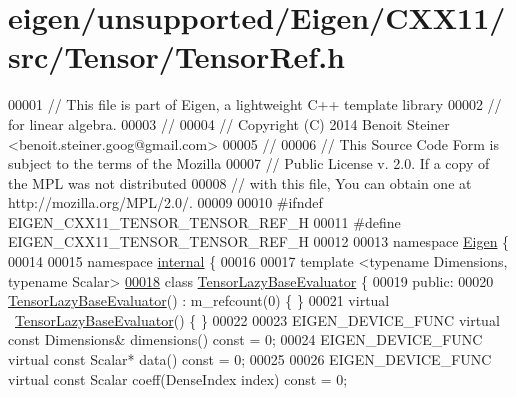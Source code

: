 \hypertarget{eigen_2unsupported_2_eigen_2_c_x_x11_2src_2_tensor_2_tensor_ref_8h_source}{}\section{eigen/unsupported/\+Eigen/\+C\+X\+X11/src/\+Tensor/\+Tensor\+Ref.h}
\label{eigen_2unsupported_2_eigen_2_c_x_x11_2src_2_tensor_2_tensor_ref_8h_source}

\begin{DoxyCode}
00001 \textcolor{comment}{// This file is part of Eigen, a lightweight C++ template library}
00002 \textcolor{comment}{// for linear algebra.}
00003 \textcolor{comment}{//}
00004 \textcolor{comment}{// Copyright (C) 2014 Benoit Steiner <benoit.steiner.goog@gmail.com>}
00005 \textcolor{comment}{//}
00006 \textcolor{comment}{// This Source Code Form is subject to the terms of the Mozilla}
00007 \textcolor{comment}{// Public License v. 2.0. If a copy of the MPL was not distributed}
00008 \textcolor{comment}{// with this file, You can obtain one at http://mozilla.org/MPL/2.0/.}
00009 
00010 \textcolor{preprocessor}{#ifndef EIGEN\_CXX11\_TENSOR\_TENSOR\_REF\_H}
00011 \textcolor{preprocessor}{#define EIGEN\_CXX11\_TENSOR\_TENSOR\_REF\_H}
00012 
00013 \textcolor{keyword}{namespace }\hyperlink{namespace_eigen}{Eigen} \{
00014 
00015 \textcolor{keyword}{namespace }\hyperlink{namespaceinternal}{internal} \{
00016 
00017 \textcolor{keyword}{template} <\textcolor{keyword}{typename} Dimensions, \textcolor{keyword}{typename} Scalar>
\hyperlink{class_eigen_1_1internal_1_1_tensor_lazy_base_evaluator}{00018} \textcolor{keyword}{class }\hyperlink{class_eigen_1_1internal_1_1_tensor_lazy_base_evaluator}{TensorLazyBaseEvaluator} \{
00019  \textcolor{keyword}{public}:
00020   \hyperlink{class_eigen_1_1internal_1_1_tensor_lazy_base_evaluator}{TensorLazyBaseEvaluator}() : m\_refcount(0) \{ \}
00021   \textcolor{keyword}{virtual} ~\hyperlink{class_eigen_1_1internal_1_1_tensor_lazy_base_evaluator}{TensorLazyBaseEvaluator}() \{ \}
00022 
00023   EIGEN\_DEVICE\_FUNC \textcolor{keyword}{virtual} \textcolor{keyword}{const} Dimensions& dimensions() \textcolor{keyword}{const} = 0;
00024   EIGEN\_DEVICE\_FUNC \textcolor{keyword}{virtual} \textcolor{keyword}{const} Scalar* data() \textcolor{keyword}{const} = 0;
00025 
00026   EIGEN\_DEVICE\_FUNC \textcolor{keyword}{virtual} \textcolor{keyword}{const} Scalar coeff(DenseIndex index) \textcolor{keyword}{const} = 0;

\end{DoxyCode}

